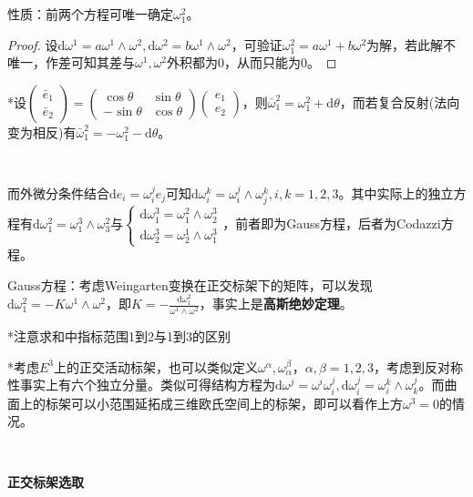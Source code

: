 \documentclass[a4paper,UTF8,fontset=windows]{ctexart}
\begin{document}
性质：前两个方程可唯一确定$\omega_1^2$。

\begin{proof}
设$\mathrm{d}\omega^1=a\omega^1\wedge\omega^2,\mathrm{d}\omega^2=b\omega^1\wedge\omega^2$，可验证$\omega_1^2=a\omega^1+b\omega^2$为解，若此解不唯一，作差可知其差与$\omega^1,\omega^2$外积都为0，从而只能为0。
\end{proof}

*设$\begin{pmatrix}\bar{e}_1\\\bar{e}_2\end{pmatrix}=\begin{pmatrix}\cos\theta&\sin\theta\\-\sin\theta&\cos\theta\end{pmatrix}\begin{pmatrix}e_1\\e_2\end{pmatrix}$，则$\bar{\omega}_1^2=\omega_1^2+\mathrm{d}\theta$，而若复合反射(法向变为相反)有$\bar{\omega}_1^2=-\omega_1^2-\mathrm{d}\theta$。

\

而外微分条件结合$\mathrm{d}e_i=\omega_i^je_j$可知$\mathrm{d}\omega_i^k=\omega_i^j\wedge\omega_j^k,i,k=1,2,3$。其中实际上的独立方程有$\mathrm{d}\omega_1^2=\omega_1^3\wedge\omega_3^2$与$\begin{cases}\mathrm{d}\omega_1^3=\omega_1^2\wedge\omega_2^3\\\mathrm{d}\omega_2^3=\omega_2^1\wedge\omega_1^3\end{cases}$，前者即为Gauss方程，后者为Codazzi方程。

Gauss方程：考虑Weingarten变换在正交标架下的矩阵，可以发现$\mathrm{d}\omega_1^2=-K\omega^1\wedge\omega^2$，即$K=-\frac{\mathrm{d}\omega_1^2}{\omega^1\wedge\omega^2}$，事实上是\textbf{高斯绝妙定理}。

*注意求和中指标范围1到2与1到3的区别

*考虑$E^3$上的正交活动标架，也可以类似定义$\omega^\alpha,\omega_\alpha^\beta$，$\alpha,\beta=1,2,3$，考虑到反对称性事实上有六个独立分量。类似可得结构方程为$\mathrm{d}\omega^j=\omega^i\omega_i^j,\mathrm{d}\omega_i^j=\omega_i^k\wedge\omega_k^j$。而曲面上的标架可以小范围延拓成三维欧氏空间上的标架，即可以看作上方$\omega^3=0$的情况。

\

\textbf{正交标架选取}
\end{document}
